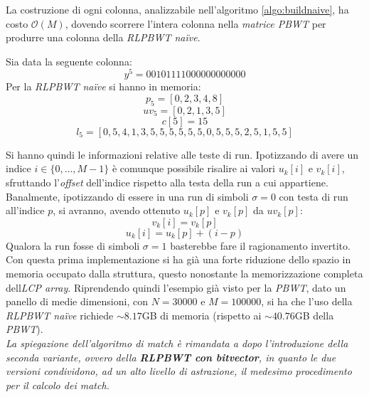 La costruzione di ogni colonna, analizzabile nell'algoritmo
\ref{algo:buildnaive}, ha costo $\mathcal{O}(M)$, dovendo scorrere l'intera
colonna nella \textit{matrice PBWT} per produrre una colonna della
\textit{RLPBWT na\"{i}ve}.
\begin{esempio}
  Sia data la seguente colonna:
  \[y^5=00101111000000000000\]
  Per la \textit{RLPBWT na\"{i}ve} si hanno in memoria:
  \[p_5=[0,2,3,4,8]\]
  \[uv_5=[0,2,1,3,5]\]
  \[c[5]=15\]
  \[l_5=[0,5,4,1,3,5,5,5,5,5,5,0,5,5,5,2,5,1,5,5]\]
\end{esempio}
Si hanno quindi le informazioni relative alle teste di run. Ipotizzando di avere
un indice $i\in\{0,\ldots,M-1\}$ è comunque possibile risalire ai valori
$u_k[i]$ e $v_k[i]$, sfruttando l'\textit{offset} dell'indice rispetto alla
testa della run a cui appartiene. Banalmente, ipotizzando di essere in una run
di simboli $\sigma=0$ con testa di run all'indice $p$, si avranno, avendo
ottenuto $u_k[p]$ e $v_k[p]$ da $uv_k[p]$:
\begin{equation}
  \label{eq:naive2}
  v_k[i]=v_k[p]
\end{equation}
\begin{equation}
  \label{eq:naive3}
  u_k[i]=u_k[p]+(i-p)
\end{equation}
Qualora la run fosse di simboli $\sigma=1$ basterebbe fare il ragionamento
invertito.\\ 
Con questa prima implementazione si ha già una forte riduzione dello spazio in
memoria occupato dalla 
struttura, questo nonostante la memorizzazione completa dell\textit{LCP array}.
Riprendendo quindi l'esempio già visto per la \textit{PBWT}, dato un panello di
medie dimensioni, con $N=30000$ e $M=100000$, si ha che l'uso della
\textit{RLPBWT na\"{i}ve} richiede $\sim 8.17$GB di memoria (rispetto ai
$\sim 40.76$GB della \textit{PBWT}).\\
\textit{La spiegazione dell'algoritmo di match è rimandata a dopo l'introduzione
  della seconda variante, ovvero della \textbf{RLPBWT con bitvector}, in quanto
  le due versioni condividono, ad un alto livello di astrazione, il medesimo
  procedimento per il calcolo dei match.}